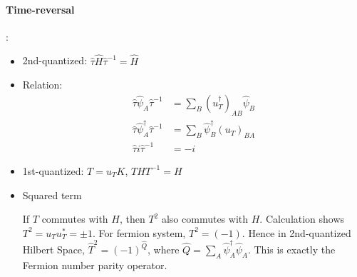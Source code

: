 \documentclass{article}
\begin{document}
\paragraph{Time-reversal}:
\begin{itemize}
    \item 2nd-quantized: 
        $\hat{\tau}\hat{H}\hat{\tau}^{-1}=\hat{H}$ 
    \item Relation:
    \begin{align}
        \hat{\tau} \hat\psi_A \hat{\tau}^{-1} &=
        \sum_B (u_T^\dagger)_{AB} \hat\psi_B \\
        \hat{\tau} \hat\psi^\dagger_A \hat{\tau}^{-1} &= 
        \sum_B  \hat\psi^\dagger_B (u_T)_{BA} \\
        \hat{\tau}i\hat{\tau}^{-1} &= -i
    \end{align}
    \item 1st-quantized:
        $T=u_T K$, $THT^{-1}=H$
    \item Squared term
        
        If $T$ commutes with $H$, then $T^2$ also
        commutes with $H$. Calculation shows $T^2= u_Tu_T^* = \pm 1$.
        For fermion system, $T^2=(-1)$. Hence in 2nd-quantized Hilbert
        Space, $\hat{T}^2=(-1)^{\hat{Q}}$, where $\hat{Q}=\sum_A
        \hat\psi^\dagger_A \hat\psi_A$. This is exactly the Fermion
        number parity operator.
\end{itemize}
\end{document}
